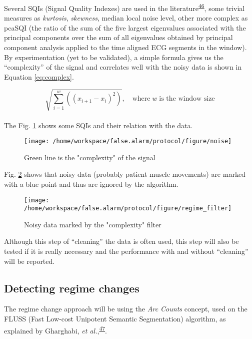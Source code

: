 \documentclass[12pt,twoside]{fmupthesis}
\begin{document}
Several SQIs (Signal Quality Indexes) are used in the literature\textsuperscript{\protect\hyperlink{ref-eerikainen2015}{46}}, some trivial
measures as \emph{kurtosis}, \emph{skewness}, median local noise level, other more complex as pcaSQI (the
ratio of the sum of the five largest eigenvalues associated with the principal components over the
sum of all eigenvalues obtained by principal component analysis applied to the time aligned ECG
segments in the window). By experimentation (yet to be validated), a simple formula gives us the
``complexity'' of the signal and correlates well with the noisy data is shown in Equation
\eqref{eq:complex}.

\hfill\break
\begin{equation}
\sqrt{\sum_{i=1}^w((x_{i+1}-x_i)^2)}, \quad \text{where}\; w \; \text{is the window size} \label{eq:complex}
\end{equation}\\
The Fig. \ref{fig:sqi} shows some SQIs and their relation with the data.
\begin{figure}

{\centering \texttt{[image: /home/workspace/false.alarm/protocol/figure/noise]} 

}

\caption{Green line is the "complexity" of the signal}\label{fig:sqi}
\end{figure}
Fig. \ref{fig:datafilter} shows that noisy data (probably patient muscle movements) are marked
with a blue point and thus are ignored by the algorithm.
\begin{figure}

{\centering \texttt{[image: /home/workspace/false.alarm/protocol/figure/regime\_filter]} 

}

\caption{Noisy data marked by the "complexity" filter}\label{fig:datafilter}
\end{figure}
Although this step of ``cleaning'' the data is often used, this step will also be tested if it is
really necessary and the performance with and without ``cleaning'' will be reported.

\hypertarget{detecting-regime-changes}{%
\subsection{Detecting regime changes}\label{detecting-regime-changes}}

The regime change approach will be using the \emph{Arc Counts} concept, used on the FLUSS (Fast Low-cost
Unipotent Semantic Segmentation) algorithm, as explained by Gharghabi, \emph{et al.},\textsuperscript{\protect\hyperlink{ref-gharghabi2018}{47}}.
\end{document}

